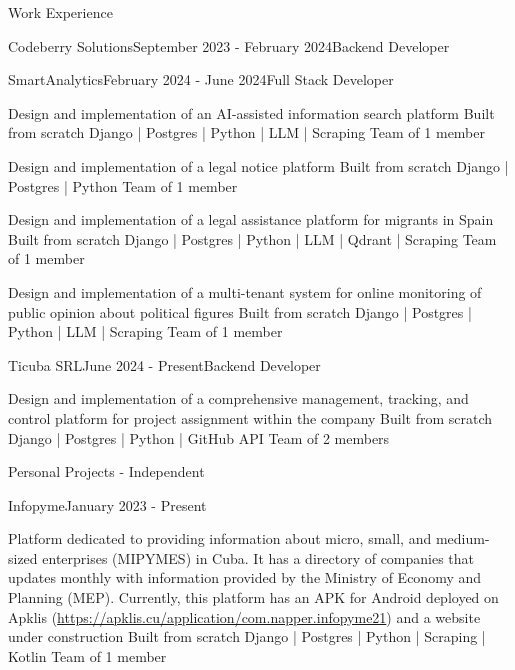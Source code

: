 \documentclass{resume}
\begin{document}
\begin{rSection}{Work Experience}
\begin{rSubsection}{Codeberry Solutions}{September 2023 - February 2024}{Backend Developer}{}
		\end{rSubsection}	
		
		\begin{rSubsection}{SmartAnalytics}{February 2024 - June 2024}{Full Stack Developer}{}
			\item Design and implementation of an AI-assisted information search platform
			\subitem Built from scratch
			\subitem Django | Postgres | Python | LLM | Scraping
			\subitem Team of 1 member
			\item Design and implementation of a legal notice platform
			\subitem Built from scratch
			\subitem Django | Postgres | Python
			\subitem Team of 1 member
			\item Design and implementation of a legal assistance platform for migrants in Spain
			\subitem Built from scratch
			\subitem Django | Postgres | Python | LLM | Qdrant | Scraping
			\subitem Team of 1 member
			\item Design and implementation of a multi-tenant system for online monitoring of public opinion about political figures
			\subitem Built from scratch
			\subitem Django | Postgres | Python | LLM | Scraping
			\subitem Team of 1 member
			
		\end{rSubsection}	
		
		\begin{rSubsection}{Ticuba SRL}{June 2024 - Present}{Backend Developer}{}
			\item Design and implementation of a comprehensive management, tracking, and control platform for project assignment within the company
			\subitem Built from scratch
			\subitem Django | Postgres | Python | GitHub API
			\subitem Team of 2 members
			
			
		\end{rSubsection}
		
	\end{rSection}
	
	\begin{rSection}{Personal Projects - Independent}
		\begin{rSubsection}{Infopyme}{January 2023 - Present}{}
			\item Platform dedicated to providing information about micro, small, and medium-sized enterprises (MIPYMES) in Cuba. It has a directory of companies that updates monthly with information provided by the Ministry of Economy and Planning (MEP). Currently, this platform has an APK for Android deployed on Apklis (\href{https://apklis.cu/application/com.napper.infopyme21}{https://apklis.cu/application/com.napper.infopyme21}) and a website under construction
			\subitem Built from scratch
			\subitem Django | Postgres | Python | Scraping | Kotlin
			\subitem Team of 1 member
		\end{rSubsection}	
	\end{rSection}
	
\end{document}
